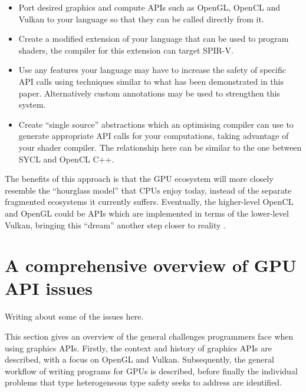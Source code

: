 \documentclass[a4paper,12pt,twoside,openright]{report}
\begin{document}
\begin{itemize}

    \item Port desired graphics and compute APIs such as OpenGL, OpenCL and
    Vulkan to your language so that they can be called directly from it.

    \item Create a modified extension of your language that can be used to
    program shaders, the compiler for this extension can target SPIR-V.

    \item Use any features your language may have to increase the safety of
    specific API calls using techniques similar to what has been demonstrated
    in this paper. Alternatively custom annotations may be used to strengthen
    this system.

    \item Create ``single source'' abstractions which an optimising compiler
    can use to generate appropriate API calls for your computations, taking
    advantage of your shader compiler. The relationship here can be similar to
    the one between SYCL and OpenCL C++.

\end{itemize}

The benefits of this approach is that the GPU ecosystem will more closely
resemble the ``hourglass model'' that CPUs enjoy today, instead of the separate
fragmented ecosystems it currently suffers. Eventually, the higher-level OpenCL
and OpenGL could be APIs which are implemented in terms of the lower-level
Vulkan, bringing this ``dream'' another step closer to reality
\cite{OpenGLonVulkan} \cite{VulkanOpenCLMerge} \cite{OpenGLOverload}.






\appendix
\singlespacing

\chapter{A comprehensive overview of GPU API issues}

\label{app:other_API_issues}

Writing about some of the issues here.

This section gives an overview of the general challenges programmers face when
using graphics APIs. Firstly, the context and history of graphics APIs are
described, with a focus on OpenGL and Vulkan. Subsequently, the general
workflow of writing programs for GPUs is described, before finally the
individual problems that type heterogeneous type safety seeks to address are
identified.
\end{document}

